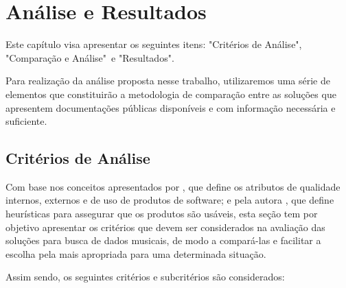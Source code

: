 \chapter{Análise e Resultados} \label{analiseResultados}
Este capítulo visa apresentar os seguintes itens: "Critérios de Análise", "Comparação e Análise"\ e "Resultados".

Para realização da análise proposta nesse trabalho, utilizaremos uma série de elementos que constituirão a metodologia de comparação entre as soluções que apresentem documentações públicas disponíveis e com informação necessária e suficiente.

\section{Critérios de Análise}

Com base nos conceitos apresentados por , que define os atributos de qualidade internos, externos e de uso de produtos de software; e pela autora , que define heurísticas para assegurar que os produtos são usáveis, esta seção tem por objetivo apresentar os critérios que devem ser considerados na avaliação das soluções para busca de dados musicais, de modo a compará-las e facilitar a escolha pela mais apropriada para uma determinada situação. 

Assim sendo, os seguintes critérios e subcritérios são considerados:

